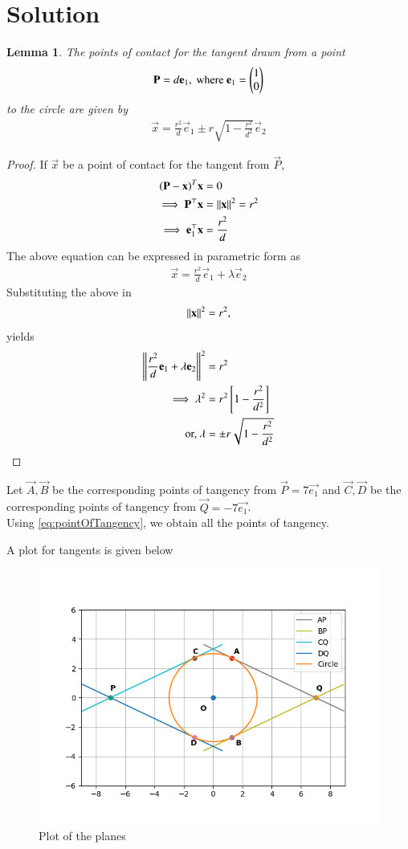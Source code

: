 \documentclass[journal,12pt,twocolumn]{IEEEtran}
\newtheorem{lemma}{Lemma}
\begin{document}
\section{Solution}
\begin{lemma}
  The points of contact for the tangent drawn from a point 
  \begin{align}
    \mathbf{P} = d\mathbf{e}_1, \text{ where } \mathbf{e}_1 = \begin{pmatrix}1\\0\end{pmatrix}
  \end{align}
  to the circle are given by 
  \begin{align}
    \vec{x} = \frac{r^2}{d}\vec{e}_1  \pm r\sqrt{1 - \frac{r^2}{d^2}} \vec{e}_2 \label{eq:pointOfTangency}
  \end{align}  
\end{lemma}
\begin{proof}
If $\vec{x}$ be a point of contact for the tangent from $\vec{P}$, 
\begin{align}
  \mathbf{(P-x)}^T\mathbf{x}&=0 \\
  \implies \mathbf{P}^{\top} \mathbf{x} &=\left\lVert\mathbf{x}\right\rVert^2 = r^2\\
  \implies \mathbf{e}_1^{\top} \mathbf{x} &= \frac{r^2}{d}
\end{align}
The above equation can be expressed in parametric form as 
\begin{align}
  \vec{x} = \frac{r^2}{d}\vec{e}_1 + \lambda \vec{e}_2
\end{align}
Substituting the above in 
\begin{align}
  \left\lVert\mathbf{x}\right\rVert^2 = r^2,
\end{align}
yields
\begin{align}
  \left\lVert\frac{r^2}{d}\mathbf{e}_1 + \lambda \mathbf{e}_2\right\rVert^2&=r^2\\
  \implies \lambda^2 &= r^2{}\left[1 - \frac{r^2}{d^2}\right]\\
  \text{or, }\lambda &= \pm r\sqrt{1 - \frac{r^2}{d^2}}
\end{align}
\end{proof}
Let $\vec{A}, \vec{B}$ be the corresponding points of tangency from $\vec{P}=7\vec{e_1}$ and 
$\vec{C}, \vec{D}$ be the corresponding points of tangency from $\vec{Q}=-7\vec{e_1}$.\\
Using \eqref{eq:pointOfTangency}, we obtain all the points of tangency.

A plot for tangents is given below
\begin{figure}[!ht]
    \centering
    \includegraphics[width=\columnwidth]{plot/figure}
    \caption{Plot of the planes}
    \label{plot}
\end{figure}
\end{document}
